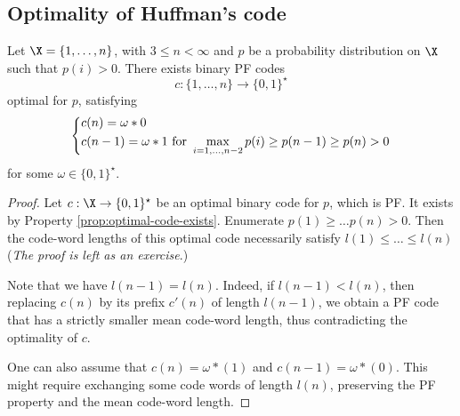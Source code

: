 \documentclass[toc]{../cs-classes/cs-classes}
\begin{document}
\subsection{Optimality of Huffman's code}
\begin{lemma}
    \label{lem:obc-base}
    Let $\X=\{1, \dots, n\}$, with $3\leq n<\infty$ and $p$ be a probability distribution on $\X$ such that $p(i)>0$. There exists binary PF codes
    \begin{equation*}
        c:\{1, \dots, n\} \to \{0, 1\}^\star
    \end{equation*}
    optimal for $p$, satisfying
    \begin{equation}
        \label{eq:base-condition}
        \begin{cases*}
            c(n) = \omega * 0 \\
            c(n-1) = \omega * 1 \textnormal{ for } \displaystyle\max_{i=1, \dots, n-2}p(i) \geq p(n-1)\geq p(n) > 0
        \end{cases*}
    \end{equation}
    for some $\omega\in\{0, 1\}^\star$.
\end{lemma}

\begin{proof}
    Let $c:\X\to\{0, 1\}^\star$ be an optimal binary code for $p$, which is PF. It exists by Property \ref{prop:optimal-code-exists}. Enumerate $p(1)\geq\dots p(n)>0$. Then the code-word lengths of this optimal code necessarily satisfy $l(1)\leq\dots\leq l(n)$ (\emph{The proof is left as an exercise}.)

    Note that we have $l(n-1)=l(n)$. Indeed, if $l(n-1)<l(n)$, then replacing $c(n)$ by its prefix $c'(n)$ of length $l(n-1)$, we obtain a PF code that has a strictly smaller mean code-word length, thus contradicting the optimality of $c$.

    One can also assume that $c(n) = \omega * (1)$ and $c(n-1)=\omega * (0)$. This might require exchanging some code words of length $l(n)$, preserving the PF property and the mean code-word length.
\end{proof}
\end{document}
